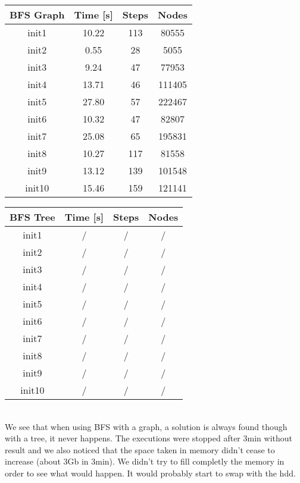 \documentclass[a4paper,10pt]{article}
\begin{document}
	\vspace{0.5cm}
	\begin{tabular}{|c||c|c|c|}
		\hline 
		\textbf{BFS Graph} & \textbf{Time [s]} & \textbf{Steps} & \textbf{Nodes} \\ 
		\hline 
		init1 & 10.22 & 113 & 80555 \\ 
		\hline 
		init2 & 0.55 & 28 & 5055 \\ 
		\hline 
		init3 & 9.24 & 47 & 77953 \\ 
		\hline 
		init4 & 13.71 & 46 & 111405 \\ 
		\hline 
		init5 & 27.80 & 57 & 222467 \\ 
		\hline 
		init6 & 10.32 & 47 & 82807 \\ 
		\hline 
		init7 & 25.08 & 65 & 195831 \\ 
		\hline 
		init8 & 10.27 & 117 & 81558 \\ 
		\hline 
		init9 & 13.12 & 139 & 101548 \\ 
		\hline
		init10 & 15.46 & 159 & 121141 \\ 
		\hline 
	\end{tabular}
	\hspace{0.5cm}
	\begin{tabular}{|c||c|c|c|}
		\hline 
		\textbf{BFS Tree} & \textbf{Time [s]} & \textbf{Steps} & \textbf{Nodes} \\ 
		\hline 
		init1 & / & / & / \\ 
		\hline 
		init2 & / & / & / \\ 
		\hline 
		init3 & / & / & / \\ 
		\hline 
		init4 & / & / & / \\ 
		\hline 
		init5 & / & / & / \\ 
		\hline 
		init6 & / & / & / \\ 
		\hline 
		init7 & / & / & / \\ 
		\hline 
		init8 & / & / & / \\ 
		\hline 
		init9 & / & / & / \\ 
		\hline 
		init10 & / & / & / \\ 
		\hline 
	\end{tabular}
	\vspace{0.5cm}\\
	We see that when using BFS with a graph, a solution is always found though with a tree, it never happens. The executions were stopped after 3min without result and we also noticed that the space taken in memory didn't cease to increase (about 3Gb in 3min). We didn't try to fill completly the memory in order to see what would happen. It would probably start to swap with the hdd.
	\vspace{1cm}
	
\end{document}
